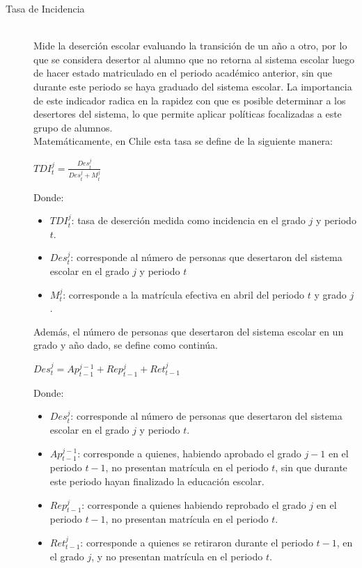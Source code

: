 \begin{description}
  \item[Tasa de Incidencia] \hfill \\
  Mide la deserción escolar evaluando la transición de un año a otro, por lo que se considera desertor al alumno que no retorna al sistema escolar luego de hacer estado matriculado en el periodo académico anterior, sin que durante este periodo se haya graduado del sistema escolar. 
  La importancia de este indicador radica en la rapidez con que es posible determinar a los desertores del sistema, lo que permite aplicar políticas focalizadas a este grupo de alumnos.\\
  Matemáticamente, en Chile esta tasa se define de la siguiente manera:\\
  
  \begin{center}
$TDI_t^j = \frac{Des_{t}^{j}}{Des_{t}^{j} + M_{t}^{j}}$
    \end{center}
Donde:
\begin{itemize}[label=]
    \item $TDI_t^j$: tasa de deserción medida como incidencia en el grado $j$ y periodo $t$.
    \item $Des_{t}^{j}$: corresponde al número de personas que desertaron del sistema escolar en el grado $j$ y periodo $t$
    \item $M_{t}^{j}$: corresponde a la matrícula efectiva en abril del periodo $t$ y grado $j$.
\end{itemize}

\newpage

    Además, el número de personas que desertaron del sistema escolar en un grado y año dado, se define como continúa.

  \begin{center}
  $Des_{t}^{j} = Ap_{t-1}^{j-1} + Rep_{t-1}^{j} + Ret_{t-1}^{j}$\\
    \end{center}
Donde:
\begin{itemize}[label=]
    \item $Des_{t}^{j}$: corresponde al número de personas que desertaron del sistema escolar en el grado $j$ y periodo $t$.
    \item $Ap_{t-1}^{j-1}$: corresponde a quienes, habiendo aprobado el grado $j-1$ en el periodo $t-1$, no presentan matrícula en el periodo $t$, sin que durante este periodo hayan finalizado la educación escolar.
    \item $Rep_{t-1}^{j}$: corresponde a quienes habiendo reprobado el grado $j$ en el periodo $t-1$, no presentan matrícula en el periodo $t$.
    \item $Ret_{t-1}^{j}$: corresponde a quienes se retiraron durante el periodo $t-1$, en el grado $j$, y no presentan matrícula en el periodo $t$.
\end{itemize}



\end{description}
